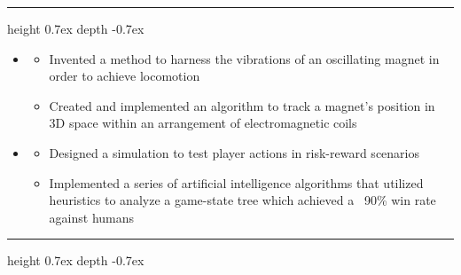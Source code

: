\documentclass[10pt,letterpaper]{article}
\def\Vhrulefill{\leavevmode\leaders\hrule height 0.7ex depth \dimexpr0.4pt-0.7ex\hfill\kern0pt}
\begin{document}
%
%


\vspace{-.78mm}
\noindent \large{}  \Vhrulefill
\vspace{-.7mm}


\begin{itemize}[label={}]
 \item \small{ \hfill {}}
 \vspace{-1.58mm}
 \begin{itemize}[label={}]
 	\item \small{Invented a method to harness the vibrations of an oscillating magnet in order to achieve locomotion}
 	\item \small{Created and implemented an algorithm to track a magnet's position in 3D space within an arrangement of electromagnetic coils}
 \end{itemize} 
 
 \item \small{ \hfill {}}
 \vspace{-1.58mm}
 \begin{itemize}[label={}]
 	\item \small{Designed a simulation to test player actions in risk-reward scenarios}
 	\item \small{Implemented a series of artificial intelligence algorithms that utilized heuristics to analyze a game-state tree which achieved a ~90\% win rate against humans}
 \end{itemize} 
\end{itemize}




%
%


\vspace{-.78mm}
\noindent \large{}  \Vhrulefill
\vspace{-.7mm}
\end{document}
